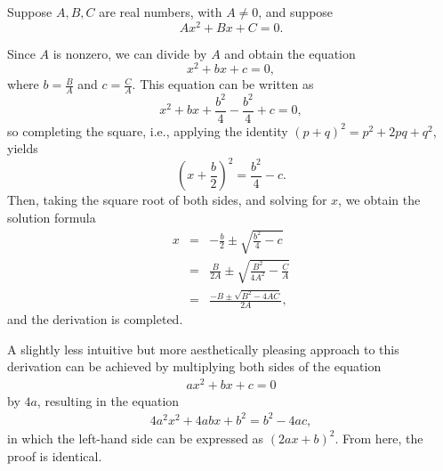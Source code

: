 \documentclass[12pt]{article}
\begin{document}
Suppose $A,B,C$ are real numbers, with $A\neq 0$, and suppose
 \[Ax^2+Bx+C=0.\]

Since $A$ is nonzero, we can divide by $A$ and obtain the equation
\[
x^2 + bx+c = 0,
\]
where $b=\frac{B}{A}$ and $c=\frac{C}{A}$.  
This equation can be written as
$$x^2 + bx + \frac{b^2}{4} -\frac{b^2}{4} +c =0,$$
so completing the square, i.e., applying the identity $(p+q)^2=p^2+2pq + q^2$, yields
$$\left(x+\frac{b}{2}\right)^2 = \frac{b^2}{4} - c.$$
Then, taking the square root of both sides, and solving for $x$, we obtain 
the solution formula
\begin{eqnarray*}
x &=& -\frac{b}{2} \pm \sqrt{\frac{b^2}{4}-c}\nonumber\\
 &=& \frac{B}{2A} \pm \sqrt{\frac{B^2}{4A^2}-\frac{C}{A}}\nonumber\\
 &=& \frac{-B\pm\sqrt{B^2-4AC}}{2A},
\end{eqnarray*}
and the derivation is completed.

A slightly less intuitive but more aesthetically pleasing approach to this derivation can be achieved by multiplying both sides of the equation
\begin{align*}
ax^2+bx+c=0
\end{align*}
by $4a$, resulting in the equation
\begin{align*}
4a^2x^2+4abx+b^2=b^2-4ac,
\end{align*}
in which the left-hand side can be expressed as $(2ax+b)^2$.  From here, the proof is identical.
\end{document}
